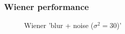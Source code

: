 \pagebreak
\subsubsection{Wiener performance}

\begin{figure}[!htb]\centering
    \begin{minipage}{0.45\textwidth}
        \caption{\small{Wiener 'blur + noise ($\sigma^2 = 30$)'}}
    \end{minipage}
    \begin{minipage}{0.45\textwidth}

\end{minipage}
\end{figure}

